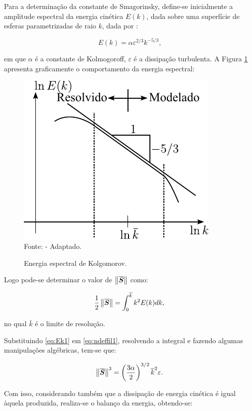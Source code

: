 Para a determinação da constante de Smagorinsky, define-se inicialmente a amplitude espectral da energia cinética $E(k)$, dada sobre uma superfície de esferas parametrizadas de raio $k$, dada por \cite{hughes2000large}:

\begin{equation}
    E(k)=\alpha\varepsilon^{2/3}k^{-5/3}\text{,}\label{eq:Ek1}
\end{equation}

\noindent em que $\alpha$ é a constante de Kolmogoroff, $\varepsilon$ é a dissipação turbulenta. A Figura \ref{fig:EnergiaEspectral} apresenta graficamente o comportamento da energia espectral:

\begin{figure}[h!]
    \centering
    \caption{Energia espectral de Kolgomorov.}
    \includegraphics[width=0.4\linewidth]{Figuras/EnergiaEspectral.pdf}
    \\Fonte: \cite{hughes2000large} - Adaptado.
    \label{fig:EnergiaEspectral}
\end{figure}

Logo pode-se determinar o valor de $\left\lVert{\overline{\boldsymbol{S}}}\right\lVert$ como:

\begin{equation}
    \frac{1}{2}\left\lVert{\overline{\boldsymbol{S}}}\right\lVert=\int_0^{\overline{k}}{k^2E(k)dk}\text{,}\label{eq:ndeffil1}
\end{equation}

\noindent no qual $\bar{k}$ é o limite de resolução.

Substituindo \ref{eq:Ek1} em \ref{eq:ndeffil1}, resolvendo a integral e fazendo algumas manipulações algébricas, tem-se que:

\begin{equation}
    \left\lVert{\overline{\boldsymbol{S}}}\right\lVert^3=\left({\frac{3\alpha}{2}}\right)^{3/2}\overline{k}^2\varepsilon\text{.}
\end{equation}

Com isso, considerando também que a dissipação de energia cinética é igual àquela produzida, realiza-se o balanço da energia, obtendo-se:

